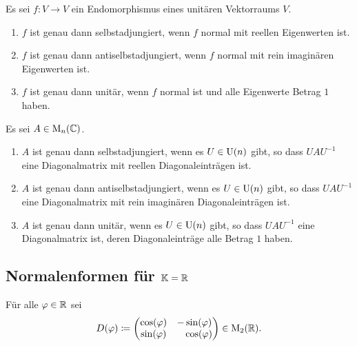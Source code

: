 \begin{proposition}
  Es sei $f \colon V \to V$ ein Endomorphismus eines unitären Vektorraums $V$.
  \begin{enumerate}[leftmargin=*, label=\roman*)]
    \item
      $f$ ist genau dann selbstadjungiert, wenn $f$ normal mit reellen Eigenwerten ist.
    \item
      $f$ ist genau dann antiselbstadjungiert, wenn $f$ normal mit rein imaginären Eigenwerten ist.
    \item
      $f$ ist genau dann unitär, wenn $f$ normal ist und alle Eigenwerte Betrag $1$ haben.
  \end{enumerate}
\end{proposition}


\begin{corollary}
  Es sei $A \in \mathrm{M}_n(\mathbb{C})$.
  \begin{enumerate}[leftmargin=*, label=\roman*)]
    \item
      $A$ ist genau dann selbstadjungiert, wenn es $U \in \mathrm{U}(n)$ gibt, so dass $U\!A U^{-1}$ eine Diagonalmatrix mit reellen Diagonaleinträgen ist.
    \item
      $A$ ist genau dann antiselbstadjungiert, wenn es $U \in \mathrm{U}(n)$ gibt, so dass $U\!A U^{-1}$ eine Diagonalmatrix mit rein imaginären Diagonaleinträgen ist.
    \item
      $A$ ist genau dann unitär, wenn es $U \in \mathrm{U}(n)$ gibt, so dass $U\!A U^{-1}$ eine Diagonalmatrix ist, deren Diagonaleinträge alle Betrag $1$ haben.
  \end{enumerate}
\end{corollary}










\subsection{Normalenformen für \texorpdfstring{$\mathbb{K} = \mathbb{R}$}{K = R}}


\begin{notation}
  Für alle $\varphi \in \mathbb{R}$ sei
  \[
    D(\varphi)
    \coloneqq
    \begin{pmatrix}
      \cos(\varphi) &          - \sin(\varphi)  \\
      \sin(\varphi) & \phantom{-}\cos(\varphi)
    \end{pmatrix}
    \in
    \mathrm{M}_2(\mathbb{R}).
  \]
\end{notation}


